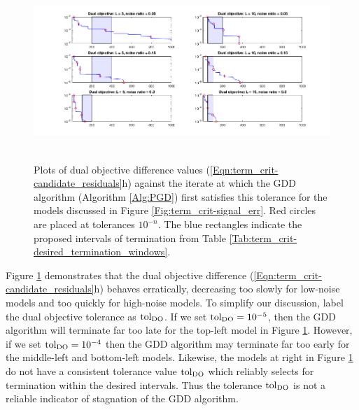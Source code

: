\begin{figure}[H]
\centering
\hbox{\hspace{-1.5cm} \includegraphics[scale=0.6]{term_crit-dual_obj} }\vspace{-0.4cm}
\caption{Plots of dual objective difference values (\ref{Eqn:term_crit-candidate_residuals}h) against the iterate at which the GDD algorithm (Algorithm \ref{Alg:PGD}) first satisfies this tolerance for the models discussed in Figure \ref{Fig:term_crit-signal_err}.  Red circles are placed at tolerances $10^{-n}$.  The blue rectangles indicate the proposed intervals of termination from Table \ref{Tab:term_crit-desired_termination_windows}.}
\label{Fig:term_crit-dual_obj}
\end{figure}


Figure \ref{Fig:term_crit-dual_obj} demonstrates that the dual objective difference (\ref{Eqn:term_crit-candidate_residuals}h) behaves erratically, decreasing too slowly for low-noise models and too quickly for high-noise models.  To simplify our discussion, label the dual objective tolerance as $\textnormal{tol}_\text{DO}$.  If we set $\textnormal{tol}_\text{DO} = 10^{-5}$, then the GDD algorithm will terminate far too late for the top-left model in Figure \ref{Fig:term_crit-dual_obj}.  However, if we set $\textnormal{tol}_\text{DO} = 10^{-4}$ then the GDD algorithm may terminate far too early for the middle-left and bottom-left models.  Likewise, the models at right in Figure \ref{Fig:term_crit-dual_obj} do not have a consistent tolerance value $\textnormal{tol}_\text{DO}$ which reliably selects for termination within the desired intervals.  Thus the tolerance $\textnormal{tol}_\text{DO}$ is not a reliable indicator of stagnation of the GDD algorithm. 




